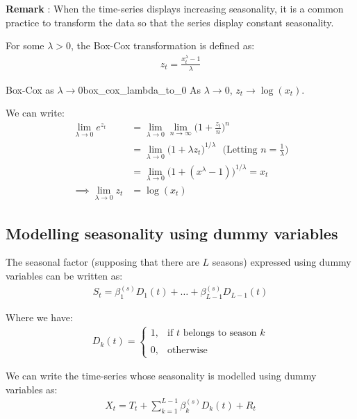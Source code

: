 \textbf{Remark} : When the time-series displays increasing seasonality, it is a common practice to transform the data so that the series display constant seasonality.

\begin{definition}
    For some $\lambda > 0$, the Box-Cox transformation is defined as:
    \begin{align*}
        z_t = \frac{x_t^\lambda-1}{\lambda}
    \end{align*}
\end{definition}

\begin{proposition}{Box-Cox as $\lambda\to0$}{box_cox_lambda_to_0}
    As $\lambda\to0$, $z_t \to \log(x_t)$.
\end{proposition}

\begin{proof*}
    We can write:
    \begin{align*}
        \lim_{\lambda\to0} e^{z_t} 
        &= \lim_{\lambda\to0} \lim_{n \to \infty} \Biggl(
            1 + \frac{z_t}{n}
        \Biggr)^n \\
        &= \lim_{\lambda \to 0} \Biggl(
            1 + \lambda z_t
        \Biggr)^{1/\lambda} \ \ \ \Biggl(
            \text{Letting } n = \frac{1}{\lambda}
        \Biggr) \\
        &= \lim_{\lambda \to 0} \Biggl(
            1 + (x^\lambda - 1)
        \Biggr)^{1/\lambda} = x_t \\
        \implies \lim_{\lambda\to0} z_t &= \log(x_t) 
    \end{align*}
\end{proof*}

\subsection{Modelling seasonality using dummy variables}
\begin{definition}
    The seasonal factor (supposing that there are $L$ seasons) expressed using dummy variables can be written as:
    \begin{align*}
        S_t = \beta^{(s)}_1D_1(t) + \dots + \beta^{(s)}_{L-1}D_{L-1}(t)
    \end{align*}

    \noindent Where we have:
    \begin{align*}
        D_k(t) = \begin{cases}
            1, &\text{if $t$ belongs to season $k$}
            \\ \\
            0, &\text{otherwise}
        \end{cases}
    \end{align*}

    \noindent We can write the time-series whose seasonality is modelled using dummy variables as:
    \begin{align*}
        X_t = T_t + \sum_{k=1}^{L-1}\beta^{(s)}_kD_k(t) + R_t
    \end{align*}
\end{definition}

